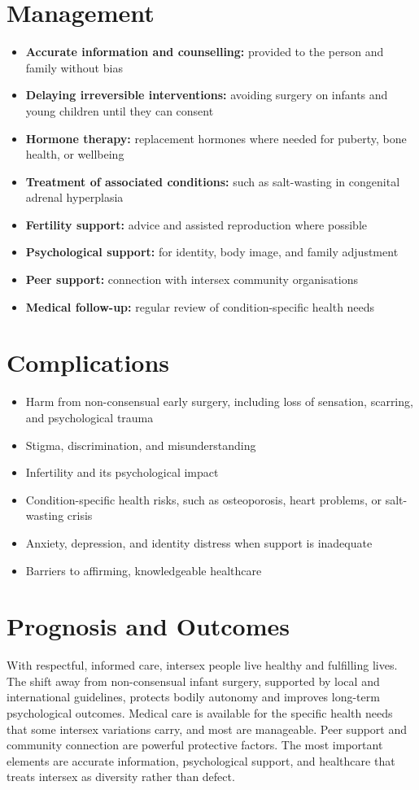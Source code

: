 \section*{Management}
\begin{itemize}
    \item \textbf{Accurate information and counselling:} provided to the person and family without bias
    \item \textbf{Delaying irreversible interventions:} avoiding surgery on infants and young children until they can consent
    \item \textbf{Hormone therapy:} replacement hormones where needed for puberty, bone health, or wellbeing
    \item \textbf{Treatment of associated conditions:} such as salt-wasting in congenital adrenal hyperplasia
    \item \textbf{Fertility support:} advice and assisted reproduction where possible
    \item \textbf{Psychological support:} for identity, body image, and family adjustment
    \item \textbf{Peer support:} connection with intersex community organisations
    \item \textbf{Medical follow-up:} regular review of condition-specific health needs
\end{itemize}

\section*{Complications}
\begin{itemize}
    \item Harm from non-consensual early surgery, including loss of sensation, scarring, and psychological trauma
    \item Stigma, discrimination, and misunderstanding
    \item Infertility and its psychological impact
    \item Condition-specific health risks, such as osteoporosis, heart problems, or salt-wasting crisis
    \item Anxiety, depression, and identity distress when support is inadequate
    \item Barriers to affirming, knowledgeable healthcare
\end{itemize}

\section*{Prognosis and Outcomes}
With respectful, informed care, intersex people live healthy and fulfilling lives. The shift away from non-consensual infant surgery, supported by local and international guidelines, protects bodily autonomy and improves long-term psychological outcomes. Medical care is available for the specific health needs that some intersex variations carry, and most are manageable. Peer support and community connection are powerful protective factors. The most important elements are accurate information, psychological support, and healthcare that treats intersex as diversity rather than defect.

